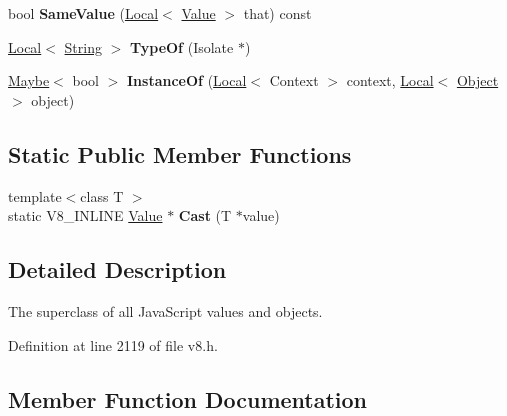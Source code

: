 \begin{DoxyCompactItemize}
\item 
\mbox{\label{classv8_1_1Value_a7c90dc5947b8b99b9089a020fff6d86d}} 
bool {\bfseries Same\+Value} (\mbox{\hyperlink{classv8_1_1Local}{Local}}$<$ \mbox{\hyperlink{classv8_1_1Value}{Value}} $>$ that) const
\item 
\mbox{\label{classv8_1_1Value_aa216d09720605b79b1d429cf1eef6050}} 
\mbox{\hyperlink{classv8_1_1Local}{Local}}$<$ \mbox{\hyperlink{classv8_1_1String}{String}} $>$ {\bfseries Type\+Of} (Isolate $\ast$)
\item 
\mbox{\label{classv8_1_1Value_a48f7a0f11ca7ae0e8b13968e7b00f76a}} 
\mbox{\hyperlink{classv8_1_1Maybe}{Maybe}}$<$ bool $>$ {\bfseries Instance\+Of} (\mbox{\hyperlink{classv8_1_1Local}{Local}}$<$ Context $>$ context, \mbox{\hyperlink{classv8_1_1Local}{Local}}$<$ \mbox{\hyperlink{classv8_1_1Object}{Object}} $>$ object)
\end{DoxyCompactItemize}
\subsection*{Static Public Member Functions}
\begin{DoxyCompactItemize}
\item 
\mbox{\label{classv8_1_1Value_ae5aa9b54ebed55819c3a4b2a3eb5fe12}} 
{\footnotesize template$<$class T $>$ }\\static V8\+\_\+\+I\+N\+L\+I\+NE \mbox{\hyperlink{classv8_1_1Value}{Value}} $\ast$ {\bfseries Cast} (T $\ast$value)
\end{DoxyCompactItemize}


\subsection{Detailed Description}
The superclass of all Java\+Script values and objects. 

Definition at line 2119 of file v8.\+h.



\subsection{Member Function Documentation}
\mbox{\label{classv8_1_1Value_a7d6045d6333598e79c9ab7d2898a9eb5}} 
